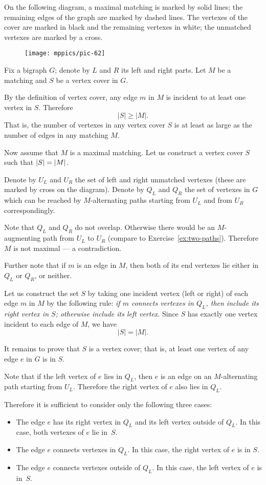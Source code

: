 On the following diagram, a maximal matching is marked by solid lines;
the remaining edges of the graph are marked by dashed lines.
The vertexes of the cover are marked in black and the remaining vertexes in white;
the unmatched vertexes are marked by a cross.

\begin{wrapfigure}{o}{30 mm}
\vskip-5mm
\centering
\texttt{[image: mppics/pic-62]}
\vskip1mm
\end{wrapfigure}

Fix a bigraph $G$;
denote by $L$ and $R$ its left and right parts.
Let $M$ be a matching and $S$ be a vertex cover in $G$.

By the definition of vertex cover, any edge $m$ in $M$ is incident to at least one vertex in $S$.
Therefore 
\[|S|\ge |M|.\] 
That is, the number of vertexes in any vertex cover $S$ is at least as large as the number of edges in any matching $M$.

Now assume that $M$ is a maximal matching.
Let us construct a vertex cover $S$ such that $|S|\z=|M|$.

Denote by $U_L$ and $U_R$ the set of left and right unmatched vertexes (these are marked by cross on the diagram).
Denote by $Q_L$ and $Q_R$ the set of vertexes in $G$ which can be reached by $M$-alternating paths starting from $U_L$ and from $U_R$ correspondingly.

Note that $Q_L$ and $Q_R$ do not overlap.
Otherwise there would be an $M$-augmenting path from $U_L$ to $U_R$ (compare to Exercise~\ref{ex:two-paths}).
Therefore $M$ is not maximal --- a contradiction.

Further note that if $m$ is an edge in $M$, then both of its end vertexes lie either in $Q_L$ or $Q_R$, or neither.

Let us construct the set $S$ by taking one incident vertex (left or right) of each edge $m$ in $M$ by the following rule:
\emph{if $m$ connects vertexes in $Q_L$, then include its right vertex in $S$;
otherwise include its left vertex}.
Since $S$ has exactly one vertex incident to each edge of $M$, we have
\[|S|=|M|.\]

It remains to prove that $S$ is a vertex cover;
that is, at least one vertex of any edge $e$ in $G$ is in $S$.

Note that if the left vertex of $e$ lies in $Q_L$, then $e$ is an edge on an $M$-alternating path starting from $U_L$. 
Therefore the right vertex of $e$ also lies in $Q_L$.

Therefore it is sufficient to consider only the following three cases:
\begin{itemize}
\item The edge $e$ has
its right vertex in $Q_L$ and its left vertex outside of $Q_L$.
In this case, both vertexes of $e$ lie in~$S$.
\item The edge $e$ connects vertexes in $Q_L$.
In this case, the right vertex of $e$ is in $S$.
\item The edge $e$ connects vertexes outside of $Q_L$. 
In this case, the left vertex of $e$ is in~$S$.
\qeds
\end{itemize}


